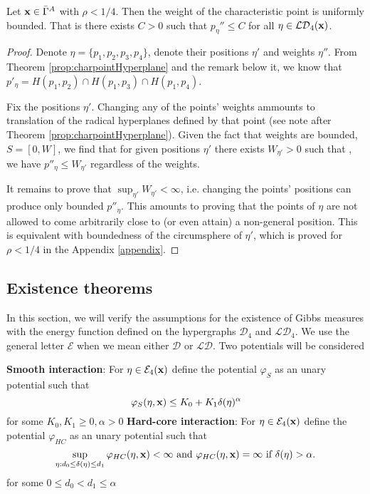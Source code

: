 \begin{proposition}\label{prop:maxPeta}
	Let ${\mathbf{x}} \in \bar\Gamma^A$ with $\rho < 1/4$. Then the weight of the characteristic point is uniformly bounded. That is there exists $C>0$ such that $p_\eta'' \leq C$ for all $\eta \in \mathcal {LD}_4({\mathbf{x}})$. 
\end{proposition}
\begin{proof}
Denote $\eta=\{p_1,p_2,p_3,p_4\}$, denote their positions $\eta'$ and weights $\eta''$. From Theorem \ref{prop:charpointHyperplane} and the remark below it, we know that $p'_\eta = H(p_1,p_2)\cap H(p_1,p_3) \cap H(p_1,p_4)$.

Fix the positions $\eta'$.  Changing any of the points' weights ammounts to translation of the radical hyperplanes defined by that point (see note after Theorem \ref{prop:charpointHyperplane}). Given the fact that weights are bounded, $S=[0,W]$, we find that for given positions $\eta'$ there exists $W_{\eta'}>0$ such that , we have $p''_\eta \leq W_{\eta'}$ regardless of the weights.

It remains to prove that $\sup_{\eta'} W_{\eta'} < \infty$, i.e. changing the points' positions can produce only bounded $p''_\eta$. This amounts to proving that the points of $\eta$ are not allowed to come arbitrarily close to (or even attain) a non-general position. This is equivalent with boundedness of the circumsphere of $\eta'$, which is proved for $\rho<1/4$ in the Appendix \ref{appendix}.
\end{proof}




\subsection{Existence theorems}\label{sec:Existence}
In this section, we will verify the assumptions for the existence of Gibbs measures with the energy function defined on the hypergraphs $\mathcal D_4$ and $\mathcal {LD}_4$. We use the general letter $\mathcal E$ when we mean either $\mathcal D$ or $\mathcal {LD}$. Two potentials will be considered

\textbf{Smooth interaction}:  For $\eta\in\mathcal E_4({\mathbf{x}})$ define the potential $\varphi_S$ as an unary potential such that
$$\varphi_S(\eta,{\mathbf{x}}) \leq K_0 + K_1 \delta(\eta)^{\alpha}$$
for some $K_0,K_1 \geq 0, \alpha >0$\newline
\textbf{Hard-core interaction}: For $\eta\in\mathcal E_4({\mathbf{x}})$ define the potential $\varphi_{HC}$ as an unary potential such that
$$\sup_{\eta: d_0 \leq \delta(\eta) \leq d_1} \varphi_{HC}(\eta,{\mathbf{x}})  < \infty \text{ and } \varphi_{HC}(\eta,{\mathbf{x}})=\infty \text{ if } \delta(\eta)>\alpha.$$ 
for some $0\leq d_0 < d_1 \leq \alpha$ 

